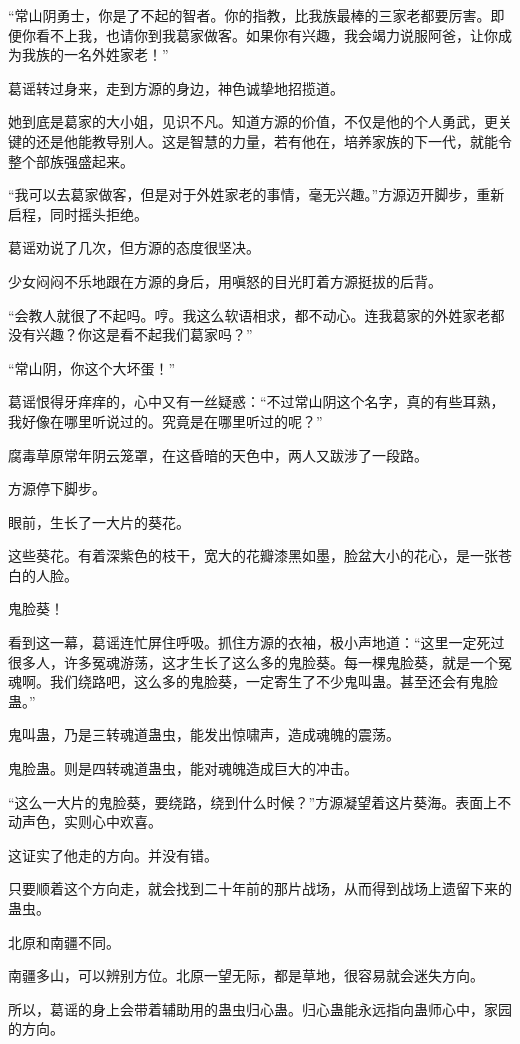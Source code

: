 \begin{this_body}
“常山阴勇士，你是了不起的智者。你的指教，比我族最棒的三家老都要厉害。即便你看不上我，也请你到我葛家做客。如果你有兴趣，我会竭力说服阿爸，让你成为我族的一名外姓家老！”

葛谣转过身来，走到方源的身边，神色诚挚地招揽道。

她到底是葛家的大小姐，见识不凡。知道方源的价值，不仅是他的个人勇武，更关键的还是他能教导别人。这是智慧的力量，若有他在，培养家族的下一代，就能令整个部族强盛起来。

“我可以去葛家做客，但是对于外姓家老的事情，毫无兴趣。”方源迈开脚步，重新启程，同时摇头拒绝。

葛谣劝说了几次，但方源的态度很坚决。

少女闷闷不乐地跟在方源的身后，用嗔怒的目光盯着方源挺拔的后背。

“会教人就很了不起吗。哼。我这么软语相求，都不动心。连我葛家的外姓家老都没有兴趣？你这是看不起我们葛家吗？”

“常山阴，你这个大坏蛋！”

葛谣恨得牙痒痒的，心中又有一丝疑惑：“不过常山阴这个名字，真的有些耳熟，我好像在哪里听说过的。究竟是在哪里听过的呢？”

腐毒草原常年阴云笼罩，在这昏暗的天色中，两人又跋涉了一段路。

方源停下脚步。

眼前，生长了一大片的葵花。

这些葵花。有着深紫色的枝干，宽大的花瓣漆黑如墨，脸盆大小的花心，是一张苍白的人脸。

鬼脸葵！

看到这一幕，葛谣连忙屏住呼吸。抓住方源的衣袖，极小声地道：“这里一定死过很多人，许多冤魂游荡，这才生长了这么多的鬼脸葵。每一棵鬼脸葵，就是一个冤魂啊。我们绕路吧，这么多的鬼脸葵，一定寄生了不少鬼叫蛊。甚至还会有鬼脸蛊。”

鬼叫蛊，乃是三转魂道蛊虫，能发出惊啸声，造成魂魄的震荡。

鬼脸蛊。则是四转魂道蛊虫，能对魂魄造成巨大的冲击。

“这么一大片的鬼脸葵，要绕路，绕到什么时候？”方源凝望着这片葵海。表面上不动声色，实则心中欢喜。

这证实了他走的方向。并没有错。

只要顺着这个方向走，就会找到二十年前的那片战场，从而得到战场上遗留下来的蛊虫。

北原和南疆不同。

南疆多山，可以辨别方位。北原一望无际，都是草地，很容易就会迷失方向。

所以，葛谣的身上会带着辅助用的蛊虫归心蛊。归心蛊能永远指向蛊师心中，家园的方向。


\end{this_body}
